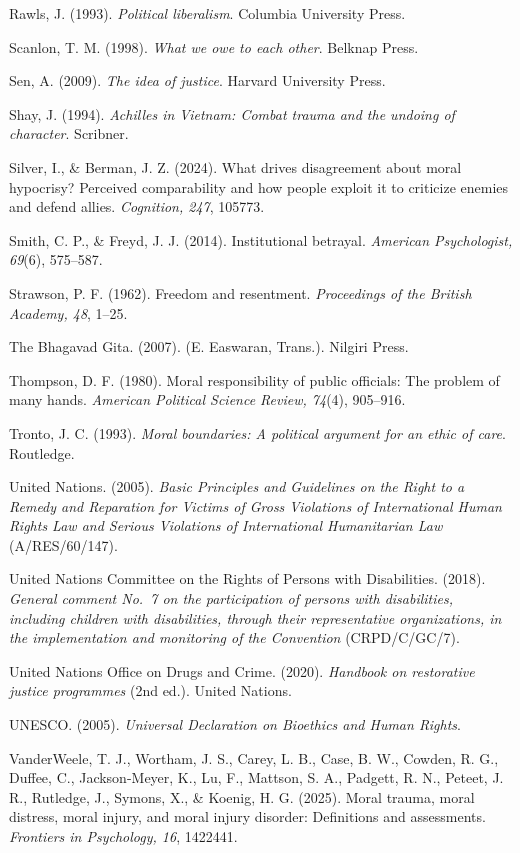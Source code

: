 \documentclass[
  11pt,
]{article}
\begin{document}
Rawls, J. (1993). \emph{Political liberalism}. Columbia University
Press.

Scanlon, T. M. (1998). \emph{What we owe to each other}. Belknap Press.

Sen, A. (2009). \emph{The idea of justice}. Harvard University Press.

Shay, J. (1994). \emph{Achilles in Vietnam: Combat trauma and the
undoing of character}. Scribner.

Silver, I., \& Berman, J. Z. (2024). What drives disagreement about
moral hypocrisy? Perceived comparability and how people exploit it to
criticize enemies and defend allies. \emph{Cognition, 247}, 105773.

Smith, C. P., \& Freyd, J. J. (2014). Institutional betrayal.
\emph{American Psychologist, 69}(6), 575--587.

Strawson, P. F. (1962). Freedom and resentment. \emph{Proceedings of the
British Academy, 48}, 1--25.

The Bhagavad Gita. (2007). (E. Easwaran, Trans.). Nilgiri Press.

Thompson, D. F. (1980). Moral responsibility of public officials: The
problem of many hands. \emph{American Political Science Review, 74}(4),
905--916.

Tronto, J. C. (1993). \emph{Moral boundaries: A political argument for
an ethic of care}. Routledge.

United Nations. (2005). \emph{Basic Principles and Guidelines on the
Right to a Remedy and Reparation for Victims of Gross Violations of
International Human Rights Law and Serious Violations of International
Humanitarian Law} (A/RES/60/147).

United Nations Committee on the Rights of Persons with Disabilities.
(2018). \emph{General comment No.~7 on the participation of persons with
disabilities, including children with disabilities, through their
representative organizations, in the implementation and monitoring of
the Convention} (CRPD/C/GC/7).

United Nations Office on Drugs and Crime. (2020). \emph{Handbook on
restorative justice programmes} (2nd ed.). United Nations.

UNESCO. (2005). \emph{Universal Declaration on Bioethics and Human
Rights}.

VanderWeele, T. J., Wortham, J. S., Carey, L. B., Case, B. W., Cowden,
R. G., Duffee, C., Jackson-Meyer, K., Lu, F., Mattson, S. A., Padgett,
R. N., Peteet, J. R., Rutledge, J., Symons, X., \& Koenig, H. G. (2025).
Moral trauma, moral distress, moral injury, and moral injury disorder:
Definitions and assessments. \emph{Frontiers in Psychology, 16},
1422441.
\end{document}
